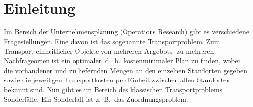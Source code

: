 %
%
%
\section{Einleitung\label{munkres:section:teil0}}

Im Bereich der Unternehmensplanung (Operations Research) gibt es verschiedene Fragestellungen.
%
%
Eine davon ist das sogenannte Transportproblem.
%
Zum Transport einheitlicher Objekte von mehreren Angebots- zu mehreren Nachfrageorten ist ein optimaler,
d.~h.~kostenminimaler Plan zu finden, wobei die vorhandenen und zu liefernden Mengen an den einzelnen Standorten gegeben sowie die jeweiligen Transportkosten pro Einheit zwischen allen Standorten bekannt sind.
Nun gibt es im Bereich des klassischen Transportproblems Sonderfälle.
Ein Sonderfall ist z.~B.~das Zuordnungsproblem.
%
